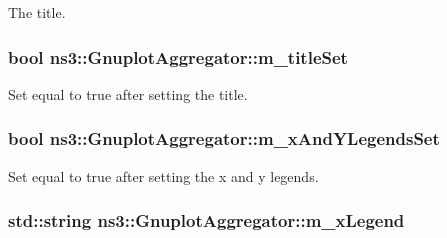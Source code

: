 The title. 

\subsubsection[{\texorpdfstring{m\+\_\+title\+Set}{m_titleSet}}]{\setlength{\rightskip}{0pt plus 5cm}bool ns3\+::\+Gnuplot\+Aggregator\+::m\+\_\+title\+Set\hspace{0.3cm}{\ttfamily [private]}}\hypertarget{classns3_1_1GnuplotAggregator_a43ddb8f3edfd6d01c2f18f9fef04c1bd}{}\label{classns3_1_1GnuplotAggregator_a43ddb8f3edfd6d01c2f18f9fef04c1bd}


Set equal to true after setting the title. 

\subsubsection[{\texorpdfstring{m\+\_\+x\+And\+Y\+Legends\+Set}{m_xAndYLegendsSet}}]{\setlength{\rightskip}{0pt plus 5cm}bool ns3\+::\+Gnuplot\+Aggregator\+::m\+\_\+x\+And\+Y\+Legends\+Set\hspace{0.3cm}{\ttfamily [private]}}\hypertarget{classns3_1_1GnuplotAggregator_a1eb3308b08bc0b37b7d46c8908d14db7}{}\label{classns3_1_1GnuplotAggregator_a1eb3308b08bc0b37b7d46c8908d14db7}


Set equal to true after setting the x and y legends. 

\subsubsection[{\texorpdfstring{m\+\_\+x\+Legend}{m_xLegend}}]{\setlength{\rightskip}{0pt plus 5cm}std\+::string ns3\+::\+Gnuplot\+Aggregator\+::m\+\_\+x\+Legend\hspace{0.3cm}{\ttfamily [private]}}\hypertarget{classns3_1_1GnuplotAggregator_a68be1be101e20dfc199a7ddd48015fe7}{}\label{classns3_1_1GnuplotAggregator_a68be1be101e20dfc199a7ddd48015fe7}



